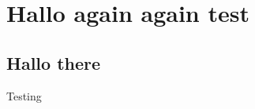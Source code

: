 \documentclass{report}
\begin{document}
\chapter{Hallo again again test}
\section{Hallo there}
    Testing
\end{document}
